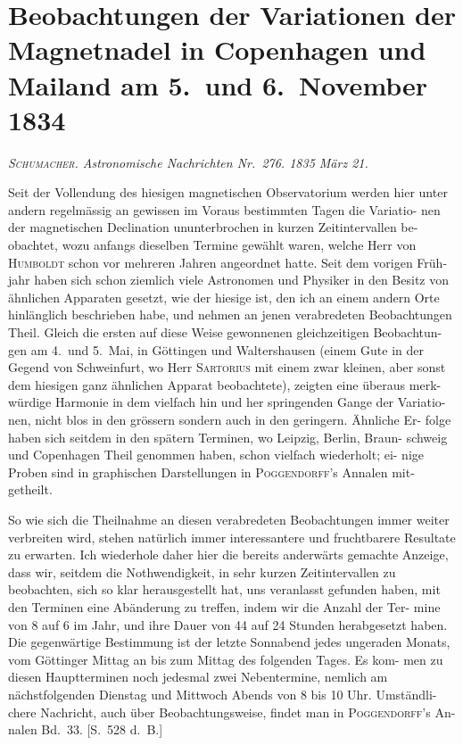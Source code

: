 \documentclass[12pt,a4paper]{article}
\begin{document}
\newpage
\section*{Beobachtungen der Variationen der Magnetnadel in Copenhagen und Mailand am 5.\ und 6.\ November 1834}

\textit{\textsc{Schumacher}. Astronomische Nachrichten Nr.\ 276. 1835 März 21.}

Seit der Vollendung des hiesigen magnetischen Observatorium werden hier 
unter andern regelmässig an gewissen im Voraus bestimmten Tagen die Variatio-
nen der magnetischen Declination ununterbrochen in kurzen Zeitintervallen be-
obachtet, wozu anfangs dieselben Termine gewählt waren, welche Herr von 
\textsc{Humboldt} schon vor mehreren Jahren angeordnet hatte. Seit dem vorigen Früh-
jahr haben sich schon ziemlich viele Astronomen und Physiker in den Besitz von 
ähnlichen Apparaten gesetzt, wie der hiesige ist, den ich an einem andern Orte 
hinlänglich beschrieben habe, und nehmen an jenen verabredeten Beobachtungen 
Theil. Gleich die ersten auf diese Weise gewonnenen gleichzeitigen Beobachtun-
gen am 4.\ und 5.\ Mai, in Göttingen und Waltershausen (einem Gute in der 
Gegend von Schweinfurt, wo Herr \textsc{Sartorius} mit einem zwar kleinen, aber sonst 
dem hiesigen ganz ähnlichen Apparat beobachtete), zeigten eine überaus merk-
würdige Harmonie in dem vielfach hin und her springenden Gange der Variatio-
nen, nicht blos in den grössern sondern auch in den geringern. Ähnliche Er-
folge haben sich seitdem in den spätern Terminen, wo Leipzig, Berlin, Braun-
schweig und Copenhagen Theil genommen haben, schon vielfach wiederholt; ei-
nige Proben sind in graphischen Darstellungen in \textsc{Poggendorff}'s Annalen mit-
getheilt.

So wie sich die Theilnahme an diesen verabredeten Beobachtungen immer 
weiter verbreiten wird, stehen natürlich immer interessantere und fruchtbarere 
Resultate zu erwarten. Ich wiederhole daher hier die bereits anderwärts gemachte 
Anzeige, dass wir, seitdem die Nothwendigkeit, in sehr kurzen Zeitintervallen 
zu beobachten, sich so klar herausgestellt hat, uns veranlasst gefunden haben, 
mit den Terminen eine Abänderung zu treffen, indem wir die Anzahl der Ter-
mine von 8 auf 6 im Jahr, und ihre Dauer von 44 auf 24 Stunden herabgesetzt 
haben. Die gegenwärtige Bestimmung ist der letzte Sonnabend jedes ungeraden 
Monats, vom Göttinger Mittag an bis zum Mittag des folgenden Tages. Es kom-
men zu diesen Hauptterminen noch jedesmal zwei Nebentermine, nemlich am 
nächstfolgenden Dienstag und Mittwoch Abends von 8 bis 10 Uhr. Umständli-
chere Nachricht, auch über Beobachtungsweise, findet man in \textsc{Poggendorff}'s An-
nalen Bd.\ 33. [S.\ 528 d.\ B.]
\end{document}
